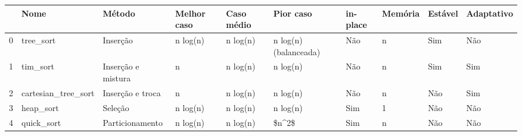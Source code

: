 \begin{tabular}{llllllllll}
\toprule
{} &                 Nome &              Método & Melhor caso & Caso médio &             Pior caso & in-place & Memória & Estável & Adaptativo \\
\midrule
0 &            tree\_sort &            Inserção &    n log(n) &   n log(n) &  n log(n)(balanceada) &      Não &       n &     Sim &        Não \\
1 &             tim\_sort &  Inserção e mistura &           n &   n log(n) &              n log(n) &      Não &       n &     Sim &        Sim \\
2 &  cartesian\_tree\_sort &    Inserção e troca &           n &   n log(n) &              n log(n) &      Não &       n &     Não &        Sim \\
3 &            heap\_sort &             Seleção &    n log(n) &   n log(n) &              n log(n) &      Sim &       1 &     Não &        Não \\
4 &           quick\_sort &     Particionamento &    n log(n) &   n log(n) &                 \$n\textasciicircum 2\$ &      Sim &       n &     Não &        Não \\
\bottomrule
\end{tabular}
